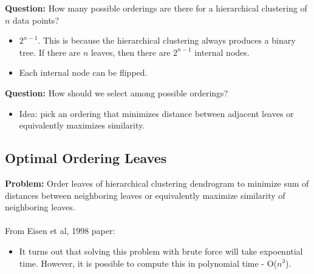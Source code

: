 \documentclass[10pt]{article}
\begin{document}
\textbf{Question:} How many possible orderings are there for a hierarchical clustering of $n$ data points?
\begin{itemize}
    \item $2^{n - 1}$.  This is because the hierarchical clustering always produces a binary tree.  If there are $n$ leaves, then there are $2^{n - 1}$ internal nodes.
    \item Each internal node can be flipped.
\end{itemize}
\textbf{Question:} How should we select among possible orderings?
\begin{itemize}
    \item Idea: pick an ordering that minimizes distance between adjacent leaves or equivalently maximizes similarity.
\end{itemize}

\subsection*{Optimal Ordering Leaves}
\textbf{Problem:} Order leaves of hierarchical clustering dendrogram to minimize sum of distances between neighboring leaves or equivalently maximize similarity of neighboring leaves.\\\\
From Eisen et al, 1998 paper:\\
\begin{itemize}
    \item It turns out that solving this problem with brute force will take expoenntial time.  However, it is possible to compute this in polynomial time - O($n^3$).
\end{itemize}
\end{document}

